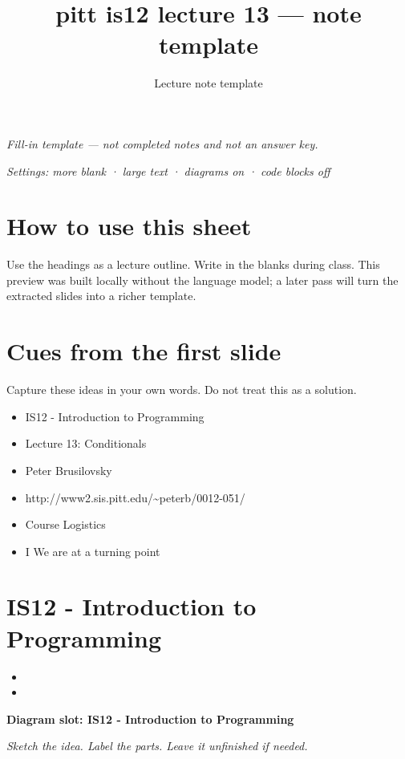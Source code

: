 \documentclass[14pt]{extarticle}
\title{pitt is12 lecture 13 — note template}
\author{Lecture note template}
\date{}
\begin{document}
\maketitle
\begin{center}
\textit{Fill-in template --- not completed notes and not an answer key.}
\end{center}
\noindent\textit{Settings: more blank · large text · diagrams on · code blocks off}
\vspace{1em}
\section*{How to use this sheet}
Use the headings as a lecture outline. Write in the blanks during class.
This preview was built locally without the language model; a later pass will
turn the extracted slides into a richer template.
\section*{Cues from the first slide}
Capture these ideas in your own words. Do not treat this as a solution.
\begin{itemize}[leftmargin=*]
  \item IS12 - Introduction to Programming \hrulefill
  \vspace{2.4em}
  \item Lecture 13: Conditionals \hrulefill
  \vspace{2.4em}
  \item Peter Brusilovsky \hrulefill
  \vspace{2.4em}
  \item http://www2.sis.pitt.edu/\textasciitilde{}peterb/0012-051/ \hrulefill
  \vspace{2.4em}
  \item Course Logistics \hrulefill
  \vspace{2.4em}
  \item I We are at a turning point \hrulefill
  \vspace{2.4em}
\end{itemize}
\section{IS12 - Introduction to Programming}
\begin{itemize}[leftmargin=*]
  \item \hrulefill
  \vspace{2.4em}
  \item \hrulefill
  \vspace{2.4em}
\end{itemize}
\noindent\textbf{Diagram slot: IS12 - Introduction to Programming}
\begin{framed}
\begin{minipage}[t][0.22\textheight]{\textwidth}
\vspace{0.4em}
\textit{Sketch the idea. Label the parts. Leave it unfinished if needed.}
\end{minipage}
\end{framed}
\vspace{1em}
\end{document}
